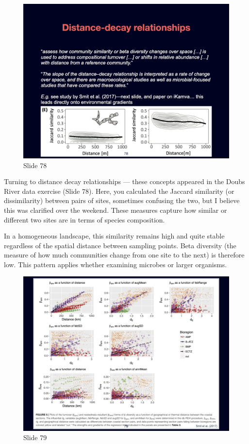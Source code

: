 \documentclass[
  11pt,
]{book}
\begin{document}
\begin{figure}[ht]
\centering
\includegraphics[width=0.8\linewidth]{../images/BDC334/BDC334-078.jpeg}
\caption*{Slide 78}
\end{figure}

Turning to distance decay relationships --- these concepts appeared in
the Doubs River data exercise (Slide 78). Here, you calculated the
Jaccard similarity (or dissimilarity) between pairs of sites, sometimes
confusing the two, but I believe this was clarified over the weekend.
These measures capture how similar or different two sites are in terms
of species composition.

In a homogeneous landscape, this similarity remains high and quite
stable regardless of the spatial distance between sampling points. Beta
diversity (the measure of how much communities change from one site to
the next) is therefore low. This pattern applies whether examining
microbes or larger organisms.

\begin{figure}[ht]
\centering
\includegraphics[width=0.8\linewidth]{../images/BDC334/BDC334-079.jpeg}
\caption*{Slide 79}
\end{figure}
\end{document}
